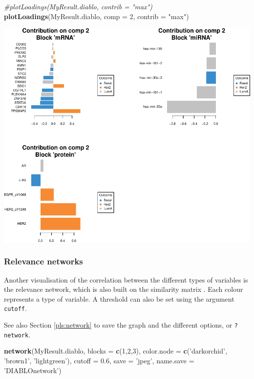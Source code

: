\documentclass[]{book}
\newenvironment{Shaded}{\begin{snugshade}}{\end{snugshade}}
\newcommand{\CommentTok}[1]{\textcolor[rgb]{0.56,0.35,0.01}{\textit{#1}}}
\newcommand{\DataTypeTok}[1]{\textcolor[rgb]{0.13,0.29,0.53}{#1}}
\newcommand{\DecValTok}[1]{\textcolor[rgb]{0.00,0.00,0.81}{#1}}
\newcommand{\FloatTok}[1]{\textcolor[rgb]{0.00,0.00,0.81}{#1}}
\newcommand{\KeywordTok}[1]{\textcolor[rgb]{0.13,0.29,0.53}{\textbf{#1}}}
\newcommand{\NormalTok}[1]{#1}
\newcommand{\StringTok}[1]{\textcolor[rgb]{0.31,0.60,0.02}{#1}}
\begin{document}
\begin{Shaded}
\begin{Highlighting}[]
\CommentTok{#plotLoadings(MyResult.diablo, contrib = "max")}
\KeywordTok{plotLoadings}\NormalTok{(MyResult.diablo, }\DataTypeTok{comp =} \DecValTok{2}\NormalTok{, }\DataTypeTok{contrib =} \StringTok{"max"}\NormalTok{)}
\end{Highlighting}
\end{Shaded}

\begin{center}\includegraphics[width=0.5\linewidth,]{Figures/06-plotLoadings-max-1} \end{center}

\hypertarget{relevance-networks}{%
\subsubsection{Relevance networks}\label{relevance-networks}}

Another visualisation of the correlation between the different types of variables is the relevance network, which is also built on the similarity matrix \citep{Gon12}. Each colour represents a type of variable. A threshold can also be set using the argument \texttt{cutoff}.

See also Section \ref{pls:network} to save the graph and the different options, or \texttt{?network}.

\begin{Shaded}
\begin{Highlighting}[]
\KeywordTok{network}\NormalTok{(MyResult.diablo, }\DataTypeTok{blocks =} \KeywordTok{c}\NormalTok{(}\DecValTok{1}\NormalTok{,}\DecValTok{2}\NormalTok{,}\DecValTok{3}\NormalTok{),}
        \DataTypeTok{color.node =} \KeywordTok{c}\NormalTok{(}\StringTok{'darkorchid'}\NormalTok{, }\StringTok{'brown1'}\NormalTok{, }\StringTok{'lightgreen'}\NormalTok{), }
        \DataTypeTok{cutoff =} \FloatTok{0.6}\NormalTok{, }\DataTypeTok{save =} \StringTok{'jpeg'}\NormalTok{, }\DataTypeTok{name.save =} \StringTok{'DIABLOnetwork'}\NormalTok{)}
\end{Highlighting}
\end{Shaded}
\end{document}
